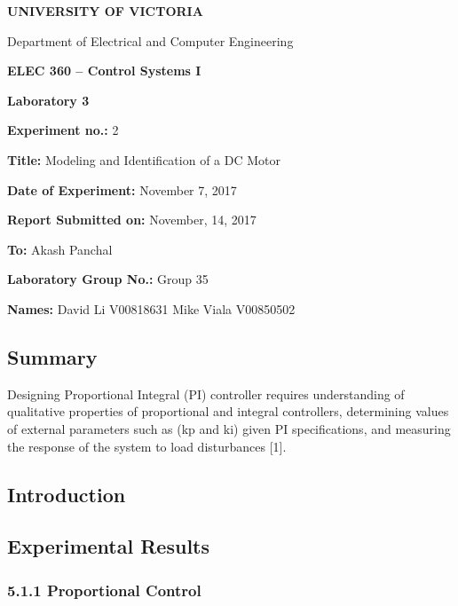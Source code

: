 \documentclass[]{article}
\renewcommand{\figurename}{Figure:}
\begin{document}
\textbf{UNIVERSITY OF VICTORIA}

Department of Electrical and
Computer Engineering


\textbf{ELEC 360 -- Control
	Systems I}

\textbf{Laboratory 3}

\textbf{Experiment no.:} 2

\textbf{Title:} Modeling and
Identification of a DC Motor



\textbf{Date of Experiment:}
November 7, 2017


\textbf{Report Submitted on:}
November, 14, 2017

\textbf{To:} Akash Panchal

\textbf{Laboratory Group No.:}
Group 35

\textbf{Names: }  David Li V00818631 \newline
  Mike Viala V00850502

\setcounter{tocdepth}{3}
\tableofcontents

{%
	\let\oldnumberline\numberline%
	\renewcommand{\numberline}{\figurename~\oldnumberline}%
	\listoffigures%
}

\subsection{Summary}\label{summary}

Designing Proportional Integral (PI) controller requires understanding
of qualitative properties of proportional and integral controllers,
determining values of external parameters such as (kp and ki) given PI
specifications, and measuring the response of the system to load
disturbances {[}1{]}.

\subsection{Introduction}\label{introduction}

\subsection{Experimental Results}\label{experimental-results}

\subsubsection{5.1.1 Proportional Control}\label{proportional-control}
\end{document}

